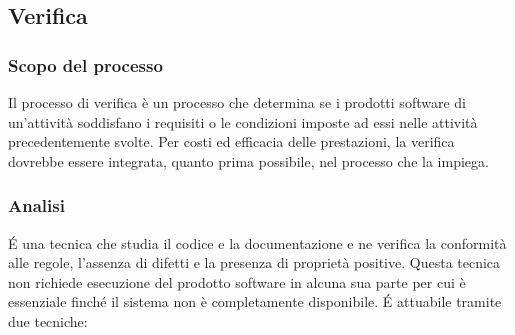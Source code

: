 \subsection{Verifica} \label{verifica}

	\subsubsection{Scopo del processo}

		Il processo di verifica è un processo che determina se i prodotti software di
		un'attività soddisfano i requisiti o le condizioni imposte ad essi nelle attività 
		precedentemente svolte.	
		Per costi ed efficacia delle prestazioni, la verifica dovrebbe essere integrata, 
		quanto prima possibile, nel processo che la impiega.
			
	\subsubsection{Analisi}	


            \'E una tecnica che studia il codice e la documentazione e ne verifica la conformità alle regole,
            l'assenza di difetti e la presenza di proprietà positive.
            Questa tecnica non richiede esecuzione del prodotto software in alcuna sua parte per cui è essenziale
            finché il sistema non è completamente disponibile.
		    \'E attuabile tramite due tecniche:

